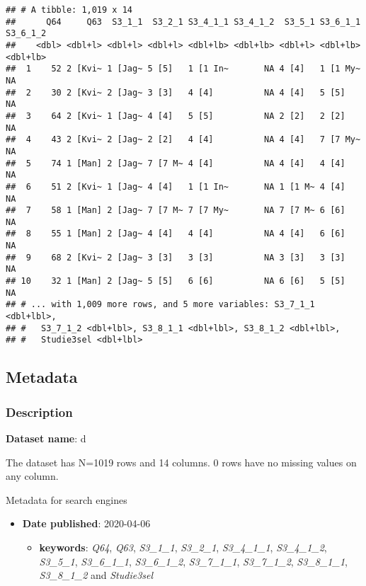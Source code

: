 \documentclass[
]{book}
\providecommand{\tightlist}{%
  \setlength{\itemsep}{0pt}\setlength{\parskip}{0pt}}
\begin{document}
\begin{verbatim}
## # A tibble: 1,019 x 14
##      Q64     Q63  S3_1_1  S3_2_1 S3_4_1_1 S3_4_1_2  S3_5_1 S3_6_1_1 S3_6_1_2
##    <dbl> <dbl+l> <dbl+l> <dbl+l> <dbl+lb> <dbl+lb> <dbl+l> <dbl+lb> <dbl+lb>
##  1    52 2 [Kvi~ 1 [Jag~ 5 [5]   1 [1 In~       NA 4 [4]   1 [1 My~       NA
##  2    30 2 [Kvi~ 2 [Jag~ 3 [3]   4 [4]          NA 4 [4]   5 [5]          NA
##  3    64 2 [Kvi~ 1 [Jag~ 4 [4]   5 [5]          NA 2 [2]   2 [2]          NA
##  4    43 2 [Kvi~ 2 [Jag~ 2 [2]   4 [4]          NA 4 [4]   7 [7 My~       NA
##  5    74 1 [Man] 2 [Jag~ 7 [7 M~ 4 [4]          NA 4 [4]   4 [4]          NA
##  6    51 2 [Kvi~ 1 [Jag~ 4 [4]   1 [1 In~       NA 1 [1 M~ 4 [4]          NA
##  7    58 1 [Man] 2 [Jag~ 7 [7 M~ 7 [7 My~       NA 7 [7 M~ 6 [6]          NA
##  8    55 1 [Man] 2 [Jag~ 4 [4]   4 [4]          NA 4 [4]   6 [6]          NA
##  9    68 2 [Kvi~ 2 [Jag~ 3 [3]   3 [3]          NA 3 [3]   3 [3]          NA
## 10    32 1 [Man] 2 [Jag~ 5 [5]   6 [6]          NA 6 [6]   5 [5]          NA
## # ... with 1,009 more rows, and 5 more variables: S3_7_1_1 <dbl+lbl>,
## #   S3_7_1_2 <dbl+lbl>, S3_8_1_1 <dbl+lbl>, S3_8_1_2 <dbl+lbl>,
## #   Studie3sel <dbl+lbl>
\end{verbatim}

\hypertarget{metadata}{%
\subsection{Metadata}\label{metadata}}

\hypertarget{description}{%
\subsubsection{Description}\label{description}}

\textbf{Dataset name}: d

The dataset has N=1019 rows and 14 columns.
0 rows have no missing values on any column.

Metadata for search engines

\begin{itemize}
\item
  \textbf{Date published}: 2020-04-06

  \begin{itemize}
  \tightlist
  \item
    \textbf{keywords}: \emph{Q64}, \emph{Q63}, \emph{S3\_1\_1}, \emph{S3\_2\_1}, \emph{S3\_4\_1\_1}, \emph{S3\_4\_1\_2}, \emph{S3\_5\_1}, \emph{S3\_6\_1\_1}, \emph{S3\_6\_1\_2}, \emph{S3\_7\_1\_1}, \emph{S3\_7\_1\_2}, \emph{S3\_8\_1\_1}, \emph{S3\_8\_1\_2} and \emph{Studie3sel}
  \end{itemize}
\end{itemize}
\end{document}
